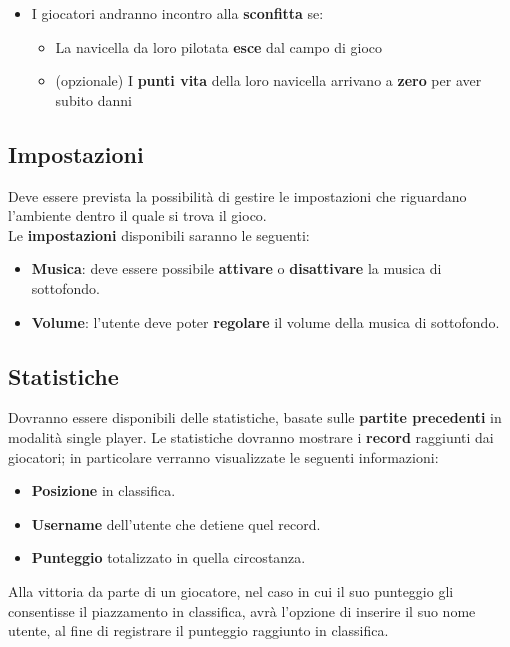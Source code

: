\begin{itemize}
\begin{itemize}
                     \item  I giocatori andranno incontro alla \textbf{sconfitta} se:
                        \begin{itemize}
                            \item La navicella da loro pilotata \textbf{esce} dal campo di gioco
                            \item (opzionale) I \textbf{punti vita} della loro navicella arrivano a \textbf{
    zero} per aver subito danni
                        \end{itemize}
                \end{itemize}
            \end{itemize}
        
        \subsection{Impostazioni}
            Deve essere prevista la possibilità di gestire le impostazioni che riguardano l'ambiente dentro il quale si trova il gioco.\\
            Le \textbf{impostazioni} disponibili saranno le seguenti:
            \begin{itemize}
                \item \textbf{Musica}: deve essere possibile \textbf{attivare} o \textbf{disattivare} la musica di sottofondo.
                \item \textbf{Volume}: l'utente deve poter \textbf{regolare} il volume della musica di sottofondo.
            \end{itemize}
            
        \subsection{Statistiche}    
            Dovranno essere disponibili delle statistiche, basate sulle \textbf{partite precedenti} in modalità single player.
            Le statistiche dovranno mostrare i \textbf{record} raggiunti dai giocatori; in particolare verranno visualizzate le seguenti informazioni: 
            \begin{itemize}
                \item \textbf{Posizione} in classifica.
                \item \textbf{Username} dell'utente che detiene quel record.
                \item \textbf{Punteggio} totalizzato in quella circostanza.
            \end{itemize}
            Alla vittoria da parte di un giocatore, nel caso in cui il suo punteggio gli consentisse il piazzamento in classifica, avrà l'opzione di inserire il suo nome utente, al fine di registrare il punteggio raggiunto in classifica.

